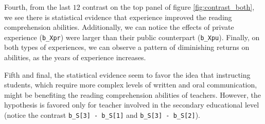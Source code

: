 Fourth, from the last $12$ contrast on the top panel of figure \ref{fig:contrast_both}, we see there is statistical evidence that experience improved the reading comprehension abilities. Additionally, we can notice the effects of private experience (\texttt{b\_Xpr}) were larger than their public counterpart (\texttt{b\_Xpu}). Finally, on both types of experiences, we can observe a pattern of diminishing returns on abilities, as the years of experience increases.

Fifth and final, the statistical evidence seem to favor the idea that instructing students, which require more complex levels of written and oral communication, might be benefiting the reading comprehension abilities of teachers. However, the hypothesis is favored only for teacher involved in the secondary educational level (notice the contrast \texttt{b\_S[3] - b\_S[1]} and \texttt{b\_S[3] - b\_S[2]}).
